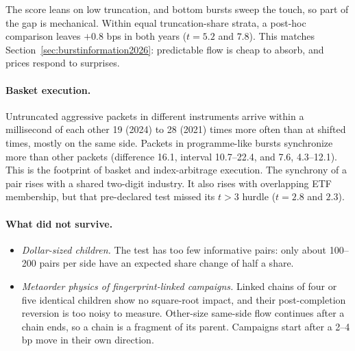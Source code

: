 \documentclass[11pt]{article}
\begin{document}
The score leans on low truncation, and bottom bursts sweep the touch, so part of the gap is
mechanical. Within equal truncation-share strata, a post-hoc comparison leaves $+0.8$ bps in both
years ($t=5.2$ and $7.8$). This matches Section~\ref{sec:burstinformation2026}: predictable flow is cheap to
absorb, and prices respond to surprises.

\paragraph{Basket execution.} Untruncated aggressive packets in different instruments arrive within
a millisecond of each other 19 (2024) to 28 (2021) times more often than at shifted times, mostly
on the same side. Packets in programme-like bursts synchronize more than other packets (difference
16.1, interval 10.7--22.4, and 7.6, 4.3--12.1). This is the footprint of basket and
index-arbitrage execution. The synchrony of a pair rises with a shared two-digit industry. It also
rises with overlapping ETF membership, but that pre-declared test missed its $t>3$ hurdle
($t=2.8$ and $2.3$).

\paragraph{What did not survive.}
\begin{itemize}
\item \emph{Dollar-sized children.} The test has too few informative pairs: only about 100--200
  pairs per side have an expected share change of half a share.
\item \emph{Metaorder physics of fingerprint-linked campaigns.} Linked chains of four or five
  identical children show no square-root impact, and their post-completion reversion is too
  noisy to measure. Other-size same-side flow continues after a chain ends, so a chain is a
  fragment of its parent. Campaigns start after a 2--4 bp move in their own direction.
\end{itemize}
\end{document}
